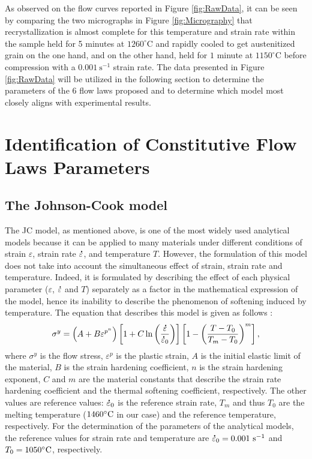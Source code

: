 \documentclass[twoside,english,1p,final,sort&compress]{elsarticle}
\theoremstyle{plain}
\DeclareRobustCommand{\mdot}[1]{\accentset{\mbox{\bfseries .}}{#1}}
\DeclareRobustCommand{\ps}{\text{s}^{-1}}
\begin{document}
As observed on the flow curves reported in Figure \ref{fig:RawData}, it can be seen by comparing the two micrographs in Figure \ref{fig:Micrography} that recrystallization is almost complete for this temperature and strain rate within the sample held for 5 minutes at $1260^\circ$C and rapidly cooled to get austenitized grain on the one hand, and on the other hand, held for $1$ minute at $1150^\circ$C before compression with a $0.001~\text{s}^{-1}$ strain rate.
The data presented in Figure \ref{fig:RawData} will be utilized in the following section to determine the parameters of the $6$ flow laws proposed and to determine which model most closely aligns with experimental results.

\section{Identification of Constitutive Flow Laws Parameters\label{sec:ConstLaws}}
\subsection{The Johnson-Cook model\label{sec:JC}}

The JC model, as mentioned above, is one of the most widely used analytical models because it can be applied to many materials under different conditions of strain $\varepsilon$, strain rate $\mdot\varepsilon$, and temperature $T$.
However, the formulation of this model does not take into account the simultaneous effect of strain, strain rate and temperature.
Indeed, it is formulated by describing the effect of each physical parameter ($\varepsilon$, $\mdot\varepsilon$ and $T$) separately as a factor in the mathematical expression of the model, hence its inability to describe the phenomenon of softening induced by temperature.
The equation that describes this model is given as follows \cite{Johnson-1983}:
\begin{equation}
\sigma^y=\left(A+B\varepsilon^{p^{n}}\right) \left[1+C\ln\left(\frac{\mdot\varepsilon}{\mdot\varepsilon_0}\right)\right] \left[1-\left(\frac{T-T_0}{T_m-T_0}\right)^{m}\right],\label{eq:Johnson-Cook}
\end{equation}
where $\sigma^y$ is the flow stress, $\varepsilon^p$ is the plastic strain, $A$ is the initial elastic limit of the material, $B$ is the strain hardening coefficient, $n$ is the strain hardening exponent, $C$ and $m$ are the material constants that describe the strain rate hardening coefficient and the thermal softening coefficient, respectively.
The other values are reference values: $\mdot\varepsilon_0$ is the reference strain rate, $T_m$ and thus $T_0$ are the melting temperature ($1460\celsius$ in our case) and the reference temperature, respectively.
For the determination of the parameters of the analytical models, the reference values for strain rate and temperature are $\mdot\varepsilon_0=0.001~\ps$ and $T_0=1050\celsius$, respectively.
\end{document}
